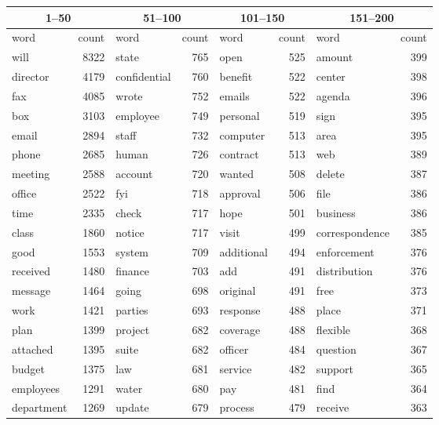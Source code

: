 \documentclass{pnastwo}
\begin{document}
\begin{article}
\begin{table}[ht]
\centering
\begin{tabular}{lr|lr|lr|lr}
 \toprule
 \multicolumn{2}{c}{1--50}& \multicolumn{2}{c}{51--100} & \multicolumn{2}{c}{101--150}& \multicolumn{2}{c}{151--200}\\
 \midrule
 word & count & word & count & word & count & word & count \\ 
  \midrule
 \cellcolor{lred} will & 8322 & \cellcolor{lred} state & 765 & open & 525 & amount & 399 \\ 
   \cellcolor{lred} director & 4179 & confidential & 760 & benefit & 522 & center & 398 \\ 
  \cellcolor{lred} fax & 4085 & wrote & 752 & emails & 522 & agenda & 396 \\ 
  \cellcolor{lred} box & 3103 & employee & 749 & personal & 519 & sign & 395 \\ 
  \cellcolor{lred} email & 2894 & staff & 732 & computer & 513 & area & 395 \\ 
  \cellcolor{lred} phone & 2685 & human & 726 & contract & 513 & web & 389 \\ 
   meeting & 2588 & account & 720 & wanted & 508 & delete & 387 \\ 
   office & 2522 & fyi & 718 & approval & 506 & file & 386 \\ 
   time & 2335 & check & 717 & hope & 501 & business & 386 \\ 
   class & 1860 & notice & 717 & visit & 499 & correspondence & 385 \\ 
   good & 1553 & system & 709 & additional & 494 & enforcement & 376 \\ 
  \cellcolor{lred} received & 1480 & finance & 703 & add & 491 & distribution & 376 \\ 
  \cellcolor{lred} message & 1464 & going & 698 & original & 491 & free & 373 \\ 
   work & 1421 & parties & 693 & response & 488 & place & 371 \\ 
   plan & 1399 & project & 682 & coverage & 488 & flexible & 368 \\ 
   \cellcolor{lred} attached & 1395 & suite & 682 & officer & 484 & question & 367 \\ 
   budget & 1375 & law & 681 & service & 482 & support & 365 \\ 
   employees & 1291 & water & 680 & pay & 481 & find & 364 \\ 
  \cellcolor{lred} department & 1269 & update & 679 & process & 479 & receive & 363 \\ 

\end{tabular}
\end{table}
\end{article}
\end{document}
